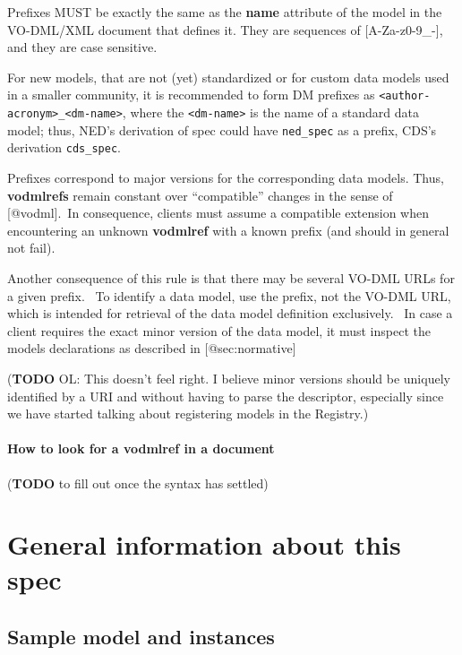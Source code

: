 \documentclass[11pt,a4paper]{ivoa}
\begin{document}
Prefixes MUST be exactly the same as the \textbf{name} attribute of the
model in the VO-DML/XML document that defines it. They are sequences of
{[}A-Za-z0-9\_-{]}, and they are case sensitive.

For new models, that are not (yet) standardized or for custom data
models used in a smaller community, it is recommended to form DM
prefixes as
\texttt{\textless{}author-acronym\textgreater{}\_\textless{}dm-name\textgreater{}},
where the \texttt{\textless{}dm-name\textgreater{}} is the name of a
standard data model; thus, NED's derivation of spec could have
\texttt{ned\_spec} as a prefix, CDS's derivation \texttt{cds\_spec}.

Prefixes correspond to major versions for the corresponding data models.
Thus, \textbf{vodmlrefs} remain constant over ``compatible'' changes in
the sense of {[}@vodml{]}.~In consequence, clients must assume a
compatible extension when encountering an unknown \textbf{vodmlref} with
a known prefix (and should in general not fail).

Another consequence of this rule is that there may be several VO-DML
URLs for a given prefix. ~To identify a data model, use the prefix, not
the VO-DML URL, which is intended for retrieval of the data model
definition exclusively. ~In case a client requires the exact minor
version of the data model, it must inspect the models declarations as
described in {[}@sec:normative{]}

(\textbf{TODO} OL: This doesn't feel right. I believe minor versions
should be uniquely identified by a URI and without having to parse the
descriptor, especially since we have started talking about registering
models in the Registry.)

\paragraph{How to look for a vodmlref in a
document}\label{how-to-look-for-a-vodmlref-in-a-document}

(\textbf{TODO} to fill out once the syntax has settled)

\section{General information about this spec}\label{sec:info}

\subsection{Sample model and
instances}\label{sample-model-and-instances}
\end{document}
